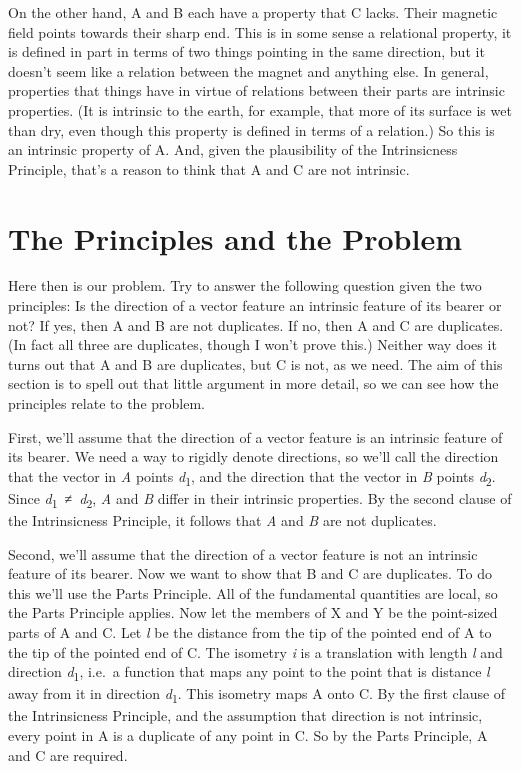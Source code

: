 \documentclass[
  11pt,
  letterpaper,
  DIV=11,
  numbers=noendperiod,
  twoside]{scrartcl}
\begin{document}
On the other hand, A and B each have a property that C lacks. Their
magnetic field points towards their sharp end. This is in some sense a
relational property, it is defined in part in terms of two things
pointing in the same direction, but it doesn't seem like a relation
between the magnet and anything else. In general, properties that things
have in virtue of relations between their parts are intrinsic
properties. (It is intrinsic to the earth, for example, that more of its
surface is wet than dry, even though this property is defined in terms
of a relation.) So this is an intrinsic property of A. And, given the
plausibility of the Intrinsicness Principle, that's a reason to think
that A and C are not intrinsic.

\section{The Principles and the
Problem}\label{the-principles-and-the-problem}

Here then is our problem. Try to answer the following question given the
two principles: Is the direction of a vector feature an intrinsic
feature of its bearer or not? If yes, then A and B are not duplicates.
If no, then A and C are duplicates. (In fact all three are duplicates,
though I won't prove this.) Neither way does it turns out that A and B
are duplicates, but C is not, as we need. The aim of this section is to
spell out that little argument in more detail, so we can see how the
principles relate to the problem.

First, we'll assume that the direction of a vector feature is an
intrinsic feature of its bearer. We need a way to rigidly denote
directions, so we'll call the direction that the vector in \emph{A}
points \emph{d}\textsubscript{1}, and the direction that the vector in
\emph{B} points \emph{d}\textsubscript{2}. Since
\emph{d}\textsubscript{1}~≠~\emph{d}\textsubscript{2}, \emph{A} and
\emph{B} differ in their intrinsic properties. By the second clause of
the Intrinsicness Principle, it follows that \emph{A} and \emph{B} are
not duplicates.

Second, we'll assume that the direction of a vector feature is not an
intrinsic feature of its bearer. Now we want to show that B and C are
duplicates. To do this we'll use the Parts Principle. All of the
fundamental quantities are local, so the Parts Principle applies. Now
let the members of X and Y be the point-sized parts of A and C. Let
\emph{l} be the distance from the tip of the pointed end of A to the tip
of the pointed end of C. The isometry \emph{i} is a translation with
length \emph{l} and direction \emph{d}\textsubscript{1}, i.e.~a function
that maps any point to the point that is distance \emph{l} away from it
in direction \emph{d}\textsubscript{1}. This isometry maps A onto C. By
the first clause of the Intrinsicness Principle, and the assumption that
direction is not intrinsic, every point in A is a duplicate of any point
in C. So by the Parts Principle, A and C are required.
\end{document}
